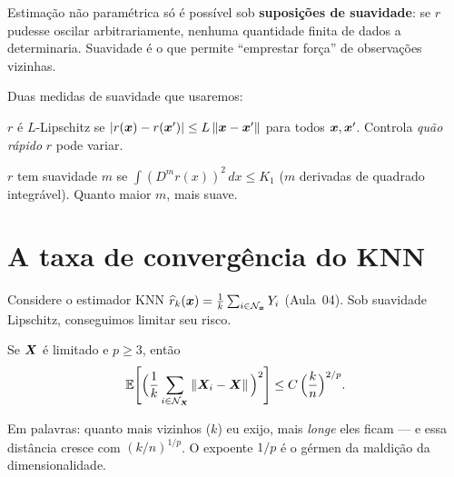\documentclass[11pt,a4paper]{article}
\begin{document}
\begin{ideia}
Estimação não paramétrica só é possível sob \textbf{suposições de suavidade}: se
$r$ pudesse oscilar arbitrariamente, nenhuma quantidade finita de dados a
determinaria. Suavidade é o que permite ``emprestar força'' de observações
vizinhas.
\end{ideia}

\noindent Duas medidas de suavidade que usaremos:
\begin{description}[leftmargin=2.2cm,style=nextline]
  \item[Lipschitz] $r$ é $L$-Lipschitz se
        $\left\lvert r(\bm{x})-r(\bm{x}') \right\rvert\le L\left\lVert \bm{x}-\bm{x}' \right\rVert$ para todos $\bm{x},\bm{x}'$. Controla
        \emph{quão rápido} $r$ pode variar.
  \item[Sobolev] $r$ tem suavidade $m$ se $\int (D^m r(x))^2\,dx \le K_1$
        ($m$ derivadas de quadrado integrável). Quanto maior $m$, mais suave.
\end{description}

\section{A taxa de convergência do KNN}
Considere o estimador KNN $\widehat{r}_k(\bm{x})=\frac1k\sum_{i\in\mathcal{N}_{\bm{x}}}Y_i$
(Aula~04). Sob suavidade Lipschitz, conseguimos limitar seu risco.

\begin{lema}\label{lem:viz}
Se $\bm{X}$ é limitado e $p\ge 3$, então
\[
  \mathbb{E}\!\left[\Big(\frac1k\sum_{i\in\mathcal{N}_{\bm{X}}}\left\lVert \bm{X}_i-\bm{X} \right\rVert\Big)^2\right]
  \le C\,\Big(\frac{k}{n}\Big)^{2/p}.
\]
\end{lema}
Em palavras: quanto mais vizinhos ($k$) eu exijo, mais \emph{longe} eles ficam --- e
essa distância cresce com $(k/n)^{1/p}$. O expoente $1/p$ é o gérmen da maldição da
dimensionalidade.
\end{document}
